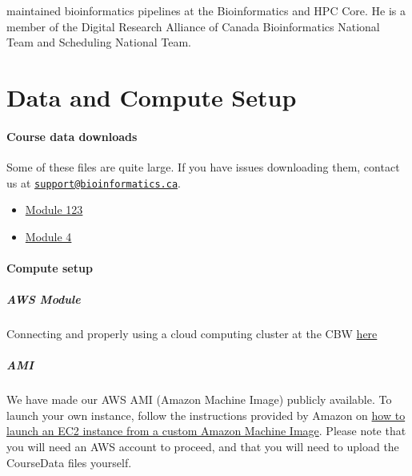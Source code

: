 \documentclass[
]{book}
\providecommand{\tightlist}{%
  \setlength{\itemsep}{0pt}\setlength{\parskip}{0pt}}
\begin{document}
maintained bioinformatics pipelines at the Bioinformatics and HPC Core. He is a member of the
Digital Research Alliance of Canada Bioinformatics National Team and Scheduling National
Team.

\chapter{Data and Compute Setup}\label{data-and-compute-setup}

\subsubsection{Course data downloads}\label{course-data-downloads}

Some of these files are quite large. If you have issues downloading them, contact us at \href{mailto:support@bioinformatics.ca}{\nolinkurl{support@bioinformatics.ca}}.

\begin{itemize}
\tightlist
\item
  \href{}{Module 123}
\item
  \href{}{Module 4}
\end{itemize}

\subsubsection{Compute setup}\label{compute-setup}

\paragraph{AWS Module}\label{aws-module}

Connecting and properly using a cloud computing cluster at the CBW \href{https://bioinformaticsdotca.github.io/AWS_EPI23}{here}

\paragraph{AMI}\label{ami}

We have made our AWS AMI (Amazon Machine Image) publicly available. To launch your own instance, follow the instructions provided by Amazon on \href{https://repost.aws/knowledge-center/launch-instance-custom-ami}{how to launch an EC2 instance from a custom Amazon Machine Image}. Please note that you will need an AWS account to proceed, and that you will need to upload the CourseData files yourself.
\end{document}
